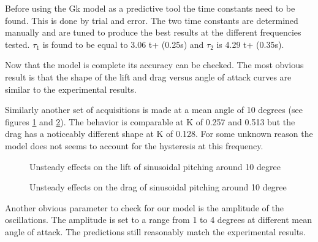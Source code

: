 \par Before using the Gk model as a predictive tool the time constants need to be found.
This is done by trial and error.
The two time constants are determined manually and are tuned to produce the best results at the different frequencies tested.
$\tau_1$ is found to be equal to 3.06 t+ (0.25s) and $\tau_2$ is 4.29 t+ (0.35s).

\par Now that the model is complete its accuracy can be checked.
The most obvious result is that the shape of the lift and drag versus angle of attack curves are similar to the experimental results.

\par Similarly another set of acquisitions is made at a mean angle of 10 degrees (see figures \ref{fig:Pitching_allcases_Cl_10} and \ref{fig:Pitching_allcases_Cd_10}).
The behavior is comparable at K of 0.257 and 0.513 but the drag has a noticeably different shape at K of 0.128.
For some unknown reason the model does not seems to account for the hysteresis at this frequency.


\begin{figure}[h]
  \begin{center}
  \end{center}
  \caption{Unsteady effects on the lift of sinusoidal pitching around 10 degree} 
  \label{fig:Pitching_allcases_Cl_10}
\end{figure}

\begin{figure}[h]
  \begin{center}
  \end{center}
  \caption{Unsteady effects on the drag of sinusoidal pitching around 10 degree} 
  \label{fig:Pitching_allcases_Cd_10}
\end{figure}

\FloatBarrier

\par Another obvious parameter to check for our model is the amplitude of the oscillations.
The amplitude is set to a range from 1 to 4 degrees at different mean angle of attack.
The predictions still reasonably match the experimental results. 



